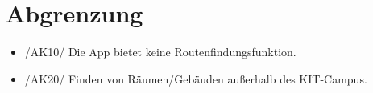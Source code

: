 \section{Abgrenzung}

\begin{itemize}

    \item{/AK10/} \label{/AK10/} Die App bietet keine \Gls{Routenfindungsfunktion}. 
    \item{/AK20/} \label{/AK20/} Finden von Räumen/Gebäuden außerhalb des \Gls{KIT}-Campus.

\end{itemize}